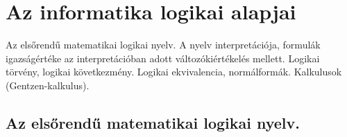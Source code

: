 \section{Az informatika logikai alapjai}
{\footnotesize Az elsőrendű matematikai logikai nyelv. A nyelv interpretációja, formulák igazságértéke az 	interpretációban adott változókiértékelés mellett. Logikai törvény, logikai következmény. 	Logikai ekvivalencia, normálformák. Kalkulusok (Gentzen-kalkulus).}
\def\InterpretOnNu{^{\langle U, \rho \rangle}_{\nu}}
\subsection{Az elsőrendű matematikai logikai nyelv.}
